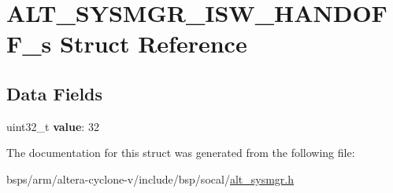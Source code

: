 \hypertarget{structALT__SYSMGR__ISW__HANDOFF__s}{}\section{A\+L\+T\+\_\+\+S\+Y\+S\+M\+G\+R\+\_\+\+I\+S\+W\+\_\+\+H\+A\+N\+D\+O\+F\+F\+\_\+s Struct Reference}
\label{structALT__SYSMGR__ISW__HANDOFF__s}
\subsection*{Data Fields}
\begin{DoxyCompactItemize}
\item 
\mbox{\label{structALT__SYSMGR__ISW__HANDOFF__s_a52a4256703385bc00c15a682b09d66f3}} 
uint32\+\_\+t {\bfseries value}\+: 32
\end{DoxyCompactItemize}


The documentation for this struct was generated from the following file\+:\begin{DoxyCompactItemize}
\item 
bsps/arm/altera-\/cyclone-\/v/include/bsp/socal/\mbox{\hyperlink{alt__sysmgr_8h}{alt\+\_\+sysmgr.\+h}}\end{DoxyCompactItemize}
